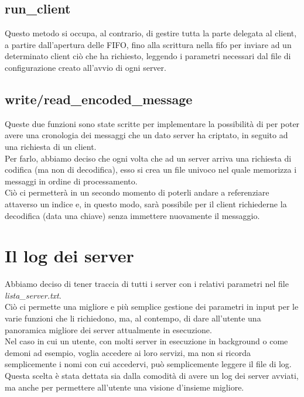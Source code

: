 \documentclass[a4paper,9pt]{article}
\begin{document}
\subsection{run\_client}
Questo metodo si occupa, al contrario, di gestire tutta la parte delegata al client, a partire dall'apertura delle FIFO, fino alla scrittura nella fifo per inviare ad un determinato client ciò che ha richiesto, leggendo i parametri necessari dal file di configurazione creato all'avvio di ogni server.
\subsection{write/read\_encoded\_message}
Queste due funzioni sono state scritte per implementare la possibilità di per poter avere una cronologia dei messaggi che un dato server ha criptato, in seguito ad una richiesta di un client.\\
Per farlo, abbiamo deciso che ogni volta che ad un server arriva una richiesta di codifica (ma non di decodifica), esso si crea un file univoco nel quale memorizza i messaggi in ordine di processamento.\\
Ciò ci permetterà in un secondo momento di poterli andare a referenziare attaverso un indice e, in questo modo, sarà possibile per il client richiederne la decodifica (data una chiave) senza immettere nuovamente il messaggio. 

\section{Il log dei server}
Abbiamo deciso di tener traccia di tutti i server con i relativi parametri nel file \emph{lista\_server.txt}.\\ 
Ciò ci permette una migliore e più semplice gestione dei parametri in input per le varie funzioni che li richiedono, ma, al contempo, di dare all'utente una panoramica migliore dei server attualmente in esecuzione.\\
Nel caso in cui un utente, con molti server in esecuzione in background o come demoni ad esempio, voglia accedere ai loro servizi, ma non si ricorda semplicemente i nomi con cui accedervi, può semplicemente leggere il file di log.\\
Questa scelta è stata dettata sia dalla comodità di avere un log dei server avviati, ma anche per permettere all'utente una visione d'insieme migliore.
\end{document}
